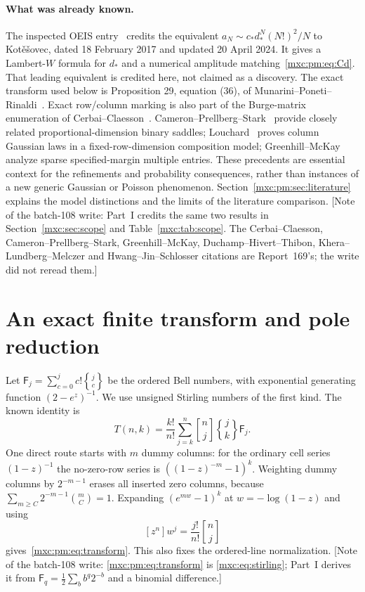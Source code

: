\documentclass[11pt]{article}
\numberwithin{equation}{section}
\theoremstyle{definition}
\theoremstyle{remark}
\newcommand{\StirOne}[2]{\genfrac{[}{]}{0pt}{}{#1}{#2}}
\newcommand{\StirTwo}[2]{\genfrac{\{} {\}}{0pt}{}{#1}{#2}}
\begin{document}
\paragraph{What was already known.}
The inspected OEIS entry~\cite{oeis784} credits the equivalent
$a_N\sim c_*d_*^N(N!)^2/N$ to Kot\v e\v sovec, dated 18 February 2017 and
updated 20 April 2024. It gives a Lambert-$W$ formula for $d_*$ and a
numerical amplitude matching~\eqref{mxc:pm:eq:Cd}. That leading equivalent is
credited here, not claimed as a discovery. The exact transform used below is
Proposition 29, equation (36), of Munarini--Poneti--Rinaldi~\cite{mpr2009}.
Exact row/column marking is also part of the Burge-matrix enumeration of
Cerbai--Claesson~\cite{pmcc23,pmcc25}. Cameron--Prellberg--Stark~\cite{pmcps,pmcpsclasses}
provide closely related proportional-dimension binary saddles;
Louchard~\cite{louchard} proves column Gaussian laws in a
fixed-row-dimension composition model; Greenhill--McKay~\cite{pmgm} analyze
sparse specified-margin multiple entries. These precedents are essential
context for the refinements and probability consequences, rather than
instances of a new generic Gaussian or Poisson phenomenon.
Section~\ref{mxc:pm:sec:literature} explains the model distinctions and the
limits of the literature comparison. [Note of the batch-108 write: Part~I
credits the same two results in Section~\ref{mxc:sec:scope} and
Table~\ref{mxc:tab:scope}. The Cerbai--Claesson, Cameron--Prellberg--Stark,
Greenhill--McKay, Duchamp--Hivert--Thibon, Khera--Lundberg--Melczer and
Hwang--Jin--Schlosser citations are Report~169's; the write did not reread
them.]

\section{An exact finite transform and pole reduction}\label{mxc:pm:sec:transform}
Let $\mathsf F_j=\sum_{c=0}^jc!\StirTwo{j}{c}$ be the ordered Bell numbers,
with exponential generating function $(2-e^z)^{-1}$. We use unsigned
Stirling numbers of the first kind. The known identity is
\begin{equation}\label{mxc:pm:eq:transform}
 T(n,k)=\frac{k!}{n!}\sum_{j=k}^n\StirOne nj\StirTwo jk\mathsf F_j.
\end{equation}
One direct route starts with $m$ dummy columns: for the ordinary cell series
$(1-z)^{-1}$ the no-zero-row series is $((1-z)^{-m}-1)^k$. Weighting dummy
columns by $2^{-m-1}$ erases all inserted zero columns, because
$\sum_{m\ge C}2^{-m-1}\binom mC=1$. Expanding $(e^{mw}-1)^k$ at
$w=-\log(1-z)$ and using
\[
 [z^n]w^j=\frac{j!}{n!}\StirOne nj
\]
gives~\eqref{mxc:pm:eq:transform}. This also fixes the ordered-line
normalization. [Note of the batch-108 write: \eqref{mxc:pm:eq:transform} is
\eqref{mxc:eq:stirling}; Part~I derives it from
$\mathsf F_q=\frac12\sum_bb^q2^{-b}$ and a binomial difference.]
\end{document}
